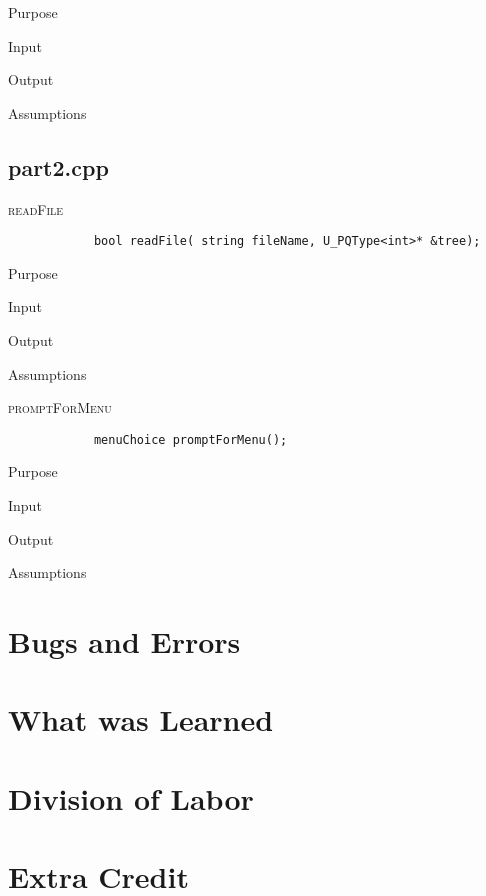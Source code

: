 \documentclass[pdftex, 12pt]{article}
\begin{document}
\begin{description}
\begin{description}
			\item{Purpose}

			\item{Input}

			\item{Output}

			\item{Assumptions}

		\end{description}
\end{description}
\subsection{part2.cpp}
\begin{description}
	\item{\textsc{readFile}}
		\begin{lstlisting}
			bool readFile( string fileName, U_PQType<int>* &tree);
		\end{lstlisting}
		\begin{description}

			\item{Purpose}

			\item{Input}

			\item{Output}

			\item{Assumptions}

		\end{description}
	\item{\textsc{promptForMenu}}
		\begin{lstlisting}
			menuChoice promptForMenu();
		\end{lstlisting}
		\begin{description}

			\item{Purpose}

			\item{Input}

			\item{Output}

			\item{Assumptions}

		\end{description}

\end{description}
\section{Bugs and Errors}

\section{What was Learned}

\section{Division of Labor}

\section{Extra Credit}
\end{document}

